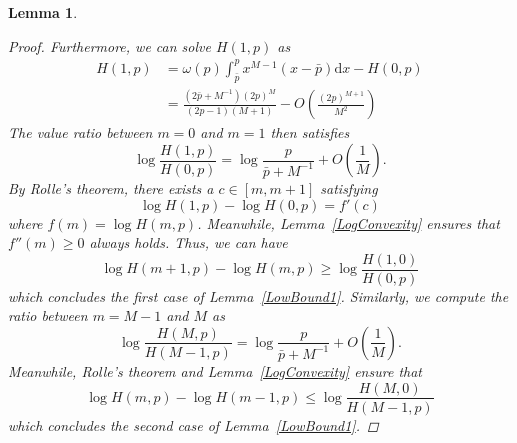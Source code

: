 \documentclass{article}
\newtheorem{lemma}[theorem]{Lemma}
\begin{document}
\begin{lemma}
\begin{proof}
Furthermore, we can solve $H(1,p)$ as
\begin{equation}
\begin{split}
H(1,p)&= \omega(p)\int_{\bar{p}}^{p}x^{M-1}(x-\bar{p})\mathrm{d}x-H(0,p)\\
&=\frac{(2\bar{p}+M^{-1})(2p)^{M}}{(2p-1)(M+1)} - O\left(\frac{(2p)^{M+1}}{M^2}\right)
\end{split}
\end{equation}
The value ratio between $m=0$ and $m=1$ then satisfies
\begin{equation}
\log \frac{H(1,p)}{H(0,p)}  = \log\frac{p}{\bar{p}+M^{-1}}+O\left(\frac{1}{M}\right).
\end{equation}
By Rolle's theorem, there exists a $c\in [m, m+1]$ satisfying
\begin{equation}
\log H(1,p) - \log H(0,p) = f'(c)
\end{equation}
where $f(m)=\log H(m,p)$. Meanwhile, Lemma~\ref{LogConvexity} ensures that $f''(m)\geq 0$ always holds. Thus, we can have
\begin{equation}
\log H(m+1,p) - \log H(m,p)\geq \log \frac{H(1,0)}{H(0,p)}
\end{equation}
which concludes the first case of Lemma~\ref{LowBound1}. Similarly, we compute the ratio between $m=M-1$ and $M$ as
\begin{equation}
\log \frac{H(M,p)}{H(M-1,p)}  = \log\frac{p}{\bar{p}+M^{-1}}+O\left(\frac{1}{M}\right).
\end{equation}
Meanwhile, Rolle's theorem and Lemma~\ref{LogConvexity} ensure that
\begin{equation}
\log H(m,p) - \log H(m-1,p)\leq \log \frac{H(M,0)}{H(M-1,p)}
\end{equation}
which concludes the second case of Lemma~\ref{LowBound1}.


\end{proof}
\end{lemma}
\end{document}
